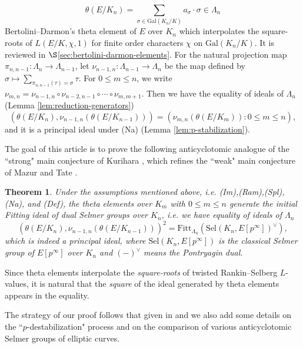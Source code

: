 \documentclass[11pt]{amsart}
\numberwithin{equation}{section}
\newtheorem{thm}{Theorem}[section]
\theoremstyle{definition}
\begin{document}
$$\theta(E/K_n) = \sum_{\sigma \in \mathrm{Gal}(K_n/K)} a_{\sigma} \cdot \sigma \in \Lambda_n$$
 Bertolini--Darmon's theta element of $E$ over $K_n$ which interpolates the square-roots of $L(E/K, \chi, 1)$ for finite order characters $\chi$ on $\mathrm{Gal}(K_n/K)$. It is reviewed in $\S$\ref{sec:bertolini-darmon-elements}.
For the natural projection map $\pi_{n, n-1} : \Lambda_{n} \to \Lambda_{n-1}$, let 
$\nu_{n-1, n} : \Lambda_{n-1} \to \Lambda_n$ be the map defined by $\sigma \mapsto \sum_{\pi_{n, n-1}(\tau) = \sigma} \tau$. For $0 \leq m \leq n$, we write
 $\nu_{m, n} = \nu_{n-1, n} \circ \nu_{n-2, n-1} \circ \cdots \circ \nu_{m, m+1} $.
Then we have the equality of ideals of $\Lambda_n$ (Lemma \ref{lem:reduction-generators})
 $$\left( \theta(E/K_n) , \nu_{n-1, n} \left( \theta(E/K_{n-1}) \right) \right) = \left( \nu_{m, n} \left( \theta(E/K_{m}) \right) : 0 \leq m \leq n \right) ,$$
and it is a principal ideal under (Na) (Lemma \ref{lem:p-stabilization}).
  
The goal of this article is to prove the following anticyclotomic analogue of the ``strong" main conjecture of Kurihara \cite[Conj. 0.3]{kurihara-invent}, which refines the ``weak" main conjecture of Mazur and Tate \cite[Conj. 3]{mazur-tate}.

\begin{thm} \label{thm:main}
Under the assumptions mentioned above, i.e. (Im),(Ram),(Spl),(Na), and (Def), 
the theta elements over $K_m$ with $0 \leq m \leq n$ generate the initial Fitting ideal of dual Selmer groups over $K_n$, i.e.
we have equality of ideals of $\Lambda_n$
$$\left( \theta(E/K_n) , \nu_{n-1, n} \left( \theta(E/K_{n-1}) \right) \right)^2  = \mathrm{Fitt}_{\Lambda_n} \left( \mathrm{Sel}(K_n, E[p^\infty])^\vee \right) ,$$
which is indeed a principal ideal, where $\mathrm{Sel}(K_n, E[p^\infty])$ is the classical Selmer group of $E[p^\infty]$ over $K_n$ and $(-)^\vee$ means the Pontryagin dual.
\end{thm}

Since theta elements interpolate the \emph{square-roots} of twisted Rankin--Selberg $L$-values, it is natural that the \emph{square} of the ideal generated by theta elements appears in the equality. 

The strategy of our proof follows that given in \cite{kim-kurihara} and we also add some details on the ``$p$-destabilization" process and on the comparison of various anticyclotomic Selmer groups of elliptic curves.
\end{document}
